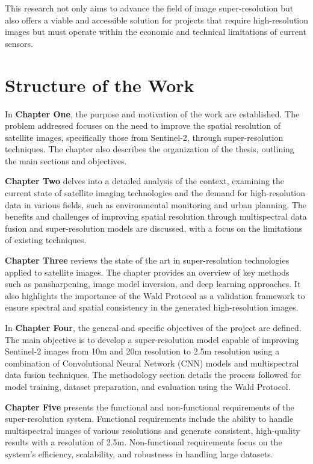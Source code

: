 This research not only aims to advance the field of image super-resolution but also offers a viable and accessible solution for projects that require high-resolution images but must operate within the economic and technical limitations of current sensors.

\section{Structure of the Work}

In \textbf{Chapter One}, the purpose and motivation of the work are established. The problem addressed focuses on the need to improve the spatial resolution of satellite images, specifically those from Sentinel-2, through super-resolution techniques. The chapter also describes the organization of the thesis, outlining the main sections and objectives.

\textbf{Chapter Two} delves into a detailed analysis of the context, examining the current state of satellite imaging technologies and the demand for high-resolution data in various fields, such as environmental monitoring and urban planning. The benefits and challenges of improving spatial resolution through multispectral data fusion and super-resolution models are discussed, with a focus on the limitations of existing techniques.

\textbf{Chapter Three} reviews the state of the art in super-resolution technologies applied to satellite images. The chapter provides an overview of key methods such as pansharpening, image model inversion, and deep learning approaches. It also highlights the importance of the Wald Protocol as a validation framework to ensure spectral and spatial consistency in the generated high-resolution images.

In \textbf{Chapter Four}, the general and specific objectives of the project are defined. The main objective is to develop a super-resolution model capable of improving Sentinel-2 images from 10m and 20m resolution to 2.5m resolution using a combination of Convolutional Neural Network (CNN) models and multispectral data fusion techniques. The methodology section details the process followed for model training, dataset preparation, and evaluation using the Wald Protocol.

\textbf{Chapter Five} presents the functional and non-functional requirements of the super-resolution system. Functional requirements include the ability to handle multispectral images of various resolutions and generate consistent, high-quality results with a resolution of 2.5m. Non-functional requirements focus on the system's efficiency, scalability, and robustness in handling large datasets.

